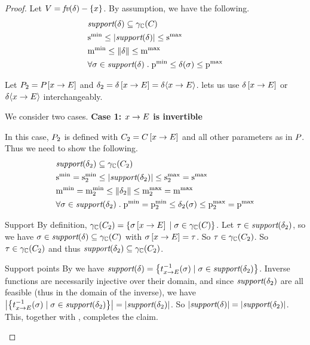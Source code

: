 \begin{proof} Let $ V = \textit{fv}(\delta) - \left\{ x \right\} $. By assumption, we
have the following.
\begin{align}
\label{thm:pp:assign:given1a} & \support{\delta} \subseteq \pconc{\getpoly{}} \\
\label{thm:pp:assign:given2a}& \smin{} \leq \setsize{\support{\delta}} \leq \smax{} \\
\label{thm:pp:assign:given3a}& \mmin{} \leq \pmass{\delta} \leq \mmax{} \\
\label{thm:pp:assign:given4a}& \forall \sigma \in \support{\delta} \;
. \; \pmin{} \leq \delta(\sigma) \leq \pmax{}
\end{align}

Let $ P_{2} = P_{} \left[ x \rightarrow E \right] $ and $ \delta_2
= \delta \left[ x \rightarrow E \right] = \delta \langle x \rightarrow E \rangle
$.  lets us use
$ \delta \left[ x \rightarrow E \right] $ or $ \delta \langle x \rightarrow E \rangle $ interchangeably.

We consider two cases.
\textbf{Case 1: $ x \rightarrow E $ is invertible}

In this case, $ P_{2} $ is defined with $ C_{2} = C \left[ x \rightarrow E \right] $ and all
other parameters as in $ P_{} $. Thus we need to show the following.
\begin{align}
\label{thm:pp:assign:cond1a}& \support{\delta_2} \subseteq \pconc{\getpoly{2}} \\
\label{thm:pp:assign:cond2a}& \smin{}
= \smin{2} \leq \setsize{\support{\delta_2}} \leq \smax{2} = \smax{} \\
\label{thm:pp:assign:cond3a}& \mmin{}
= \mmin{2} \leq \pmass{\delta_2} \leq \mmax{2} = \mmax{} \\
\label{thm:pp:assign:cond4a}& \forall \sigma \in \support{\delta_2} \;
. \; \pmin{} = \pmin{2} \leq \delta_2(\sigma) \leq \pmax{2} = \pmax{}
\end{align}

\begin{subproof}{ Support} By definition,
$ \gamma_{\mathbb{C}}(C_{2})
= \left\{ \sigma \left[ x \rightarrow E \right] \;|\; \sigma \in \gamma_{\mathbb{C}}(C_{}) \right\}
$. Let $ \tau \in \textit{support}(\delta_2) $, so we have $ \sigma \in
\textit{support}(\delta) \subseteq \gamma_{\mathbb{C}}(C_{}) $ with $ \sigma \left[ x \rightarrow E \right] = \tau $. So
$ \tau \in \gamma_{\mathbb{C}}(C_{2}) $. So $ \tau \in \gamma_{\mathbb{C}}(C_{2}) $
and thus $ \textit{support}(\delta_2) \subseteq \gamma_{\mathbb{C}}(C_{2}) $.
\end{subproof}

\begin{subproof}{ Support points}
By  we have $ \textit{support}(\delta)
= \left\{ t_{x \rightarrow E}^{-1}(\sigma) \;|\; \sigma \in \textit{support}(\delta_2) \right\}
$. Inverse functions are necessarily injective over their domain, and
since $ \textit{support}(\delta_2) $ are all feasible (thus in the domain of
the inverse), we have
$ \left| \left\{ t_{x \rightarrow E}^{-1}(\sigma) \;|\; \sigma \in \textit{support}(\delta_2) \right\} \right|
= \left| \textit{support}(\delta_2) \right| $. So $ \left| \textit{support}(\delta) \right|
= \left| \textit{support}(\delta_2) \right| $. This, together
with , completes the claim.
\end{subproof}


\end{proof}
